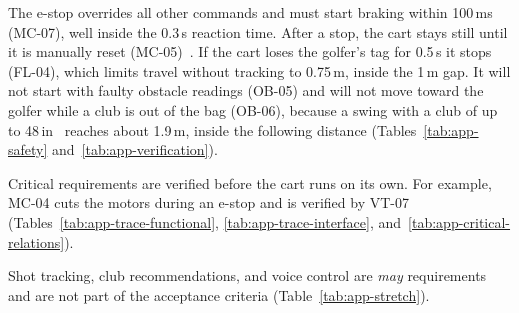 
The e-stop overrides all other commands and must start braking within 100\,ms (MC-07), well inside the 0.3\,s reaction time. After a stop, the cart stays still until it is manually reset (MC-05)~\cite{iso13850}. If the cart loses the golfer's tag for 0.5\,s it stops (FL-04), which limits travel without tracking to 0.75\,m, inside the 1\,m gap. It will not start with faulty obstacle readings (OB-05) and will not move toward the golfer while a club is out of the bag (OB-06), because a swing with a club of up to 48\,in~\cite{usgaEquipmentRules} reaches about 1.9\,m, inside the following distance (Tables~\ref{tab:app-safety} and~\ref{tab:app-verification}).


Critical requirements are verified before the cart runs on its own. For example, MC-04 cuts the motors during an e-stop and is verified by VT-07 (Tables~\ref{tab:app-trace-functional}, \ref{tab:app-trace-interface}, and~\ref{tab:app-critical-relations}).


Shot tracking, club recommendations, and voice control are \emph{may} requirements and are not part of the acceptance criteria (Table~\ref{tab:app-stretch}).
